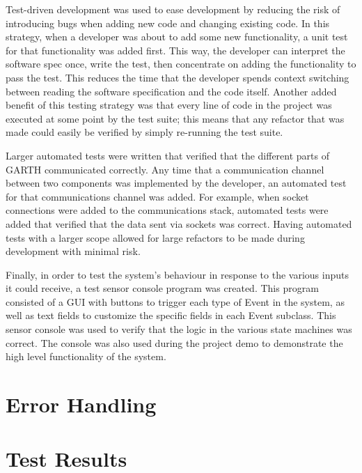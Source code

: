 \documentclass{article}
\begin{document}
Test-driven development was used to ease development by reducing the
risk of introducing bugs when adding new code and changing existing
code. In this strategy, when a developer was about to add some new
functionality, a unit test for that functionality was added
first. This way, the developer can interpret the software spec once,
write the test, then concentrate on adding the functionality to pass
the test. This reduces the time that the developer spends context
switching between reading the software specification and the code
itself. Another added benefit of this testing strategy was that every
line of code in the project was executed at some point by the test
suite; this means that any refactor that was made could easily be
verified by simply re-running the test suite.

Larger automated tests were written that verified that the different
parts of GARTH communicated correctly. Any time that a communication
channel between two components was implemented by the developer, an
automated test for that communications channel was added. For example,
when socket connections were added to the communications stack,
automated tests were added that verified that the data sent via
sockets was correct. Having automated tests with a larger scope
allowed for large refactors to be made during development with minimal
risk.

Finally, in order to test the system's behaviour in response to the
various inputs it could receive, a test sensor console program was
created. This program consisted of a GUI with buttons to trigger each
type of Event in the system, as well as text fields to customize the
specific fields in each Event subclass. This sensor console was used
to verify that the logic in the various state machines was correct. The console was also used during the project demo to demonstrate the high level functionality of the system.

\section{Error Handling} 

\section{Test Results}
\end{document}
